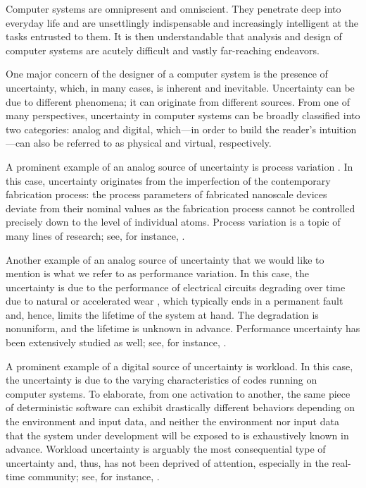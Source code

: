 Computer systems are omnipresent and omniscient. They penetrate deep into
everyday life and are unsettlingly indispensable and increasingly intelligent at
the tasks entrusted to them. It is then understandable that analysis and design
of computer systems are acutely difficult and vastly far-reaching endeavors.

One major concern of the designer of a computer system is the presence of
uncertainty, which, in many cases, is inherent and inevitable. Uncertainty can
be due to different phenomena; it can originate from different sources. From one
of many perspectives, uncertainty in computer systems can be broadly classified
into two categories: analog and digital, which---in order to build the reader's
intuition---can also be referred to as physical and virtual, respectively.

A prominent example of an analog source of uncertainty is process variation
\cite{srivastava2010}. In this case, uncertainty originates from the
imperfection of the contemporary fabrication process: the process parameters of
fabricated nanoscale devices deviate from their nominal values as the
fabrication process cannot be controlled precisely down to the level of
individual atoms. Process variation is a topic of many lines of research; see,
for instance, \cite{bhardwaj2006, bhardwaj2008, chandra2010, juan2012, lee2013}.

Another example of an analog source of uncertainty that we would like to mention
is what we refer to as performance variation. In this case, the uncertainty is
due to the performance of electrical circuits degrading over time due to natural
or accelerated wear \cite{jedec2016}, which typically ends in a permanent fault
and, hence, limits the lifetime of the system at hand. The degradation is
nonuniform, and the lifetime is unknown in advance. Performance uncertainty has
been extensively studied as well; see, for instance, \cite{coskun2006,
huang2009b, das2014c}.

A prominent example of a digital source of uncertainty is workload. In this
case, the uncertainty is due to the varying characteristics of codes running on
computer systems. To elaborate, from one activation to another, the same piece
of deterministic software can exhibit drastically different behaviors depending
on the environment and input data, and neither the environment nor input data
that the system under development will be exposed to is exhaustively known in
advance. Workload uncertainty is arguably the most consequential type of
uncertainty and, thus, has not been deprived of attention, especially in the
real-time community; see, for instance, \cite{diaz2002, santinelli2011,
quinton2012, tanasa2015}.

